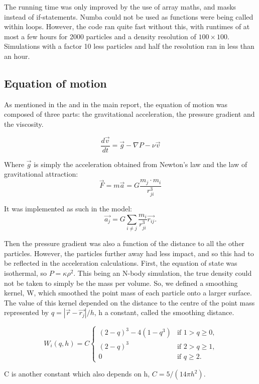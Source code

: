 \documentclass[a4paper,12pt]{article}
\begin{document}
The running time was only improved by the use of array maths, and masks instead of if-statements. Numba could not be used as functions were being called within loops. However, the code ran quite fast without this, with runtimes of at most a few hours for 2000 particles and a density resolution of $100 \times 100$. Simulations with a factor 10 less particles and half the resolution ran in less than an hour.

\subsection{Equation of motion}
As mentioned in the  and in the main report, the equation of motion was composed of three parts: the gravitational acceleration, the pressure gradient and the viscosity.

$$\frac{d\vec{v}}{dt} = \vec{g} - \nabla P - \nu \vec{v}$$

\noindent Where $\vec{g}$ is simply the acceleration obtained from Newton's law and the law of gravitational attraction:
$$\vec{F} = m\vec{a} = G\frac{m_j\cdot m_i}{r_{ji}^3}$$

\noindent It was implemented as such in the model:
$$\vec{a_{j}} = G \sum_{i \neq j} \frac{m_i}{r^3_{ji}}\vec{r_{ij}}.$$

\noindent Then the pressure gradient was also a function of the distance to all the other particles. However, the particles further away had less impact, and so this had to be reflected in the acceleration calculations. First, the equation of state was isothermal, so $P = \kappa\rho^2$. This being an N-body simulation, the true density could not be taken to simply be the mass per volume. So, we defined a smoothing kernel, W, which smoothed the point mass of each particle onto a larger surface. The value of this kernel depended on the distance to the centre of the point mass represented by $q = |\vec{r}-\vec{r_j}|/h$, h a constant, called the smoothing distance.

\begin{equation*}
  W_i(q,h) = C \begin{cases}
    (2-q)^3 - 4(1-q^3)&\text{if $1 > q\geq0$,}\\
    (2-q)^3 & \text{if $2>q\geq1$,}\\
    0 & \text{if $q\geq 2$.}
  \end{cases}
\end{equation*}

\noindent C is another constant which also depends on h, $C = 5/(14\pi h^2)$.\\
\end{document}
